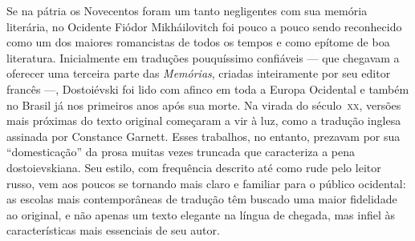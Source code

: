 Se na pátria os Novecentos foram um tanto negligentes com sua memória
literária, no Ocidente Fiódor Mikháilovitch foi pouco a pouco sendo reconhecido
como um dos maiores romancistas de todos os tempos e como epítome de boa
literatura. Inicialmente em traduções pouquíssimo confiáveis --- que chegavam a
oferecer uma terceira parte das \textit{Memórias}, criadas inteiramente por seu
editor francês ---, Dostoiévski foi lido com afinco em toda a Europa Ocidental e
também no Brasil já nos primeiros anos após sua morte. Na virada do século~\textsc{xx},
versões mais próximas do texto original começaram a vir à luz, como a tradução
inglesa assinada por Constance Garnett. Esses trabalhos, no
entanto, prezavam por sua “domesticação” da prosa muitas vezes truncada que
caracteriza a pena dostoievskiana. Seu estilo, com frequência descrito até
como rude pelo leitor russo, vem aos poucos se tornando mais claro e familiar
para o público ocidental: as escolas mais contemporâneas de tradução têm
buscado uma maior fidelidade ao original, e não apenas um texto elegante na
língua de chegada, mas infiel às características mais essenciais de seu autor.




